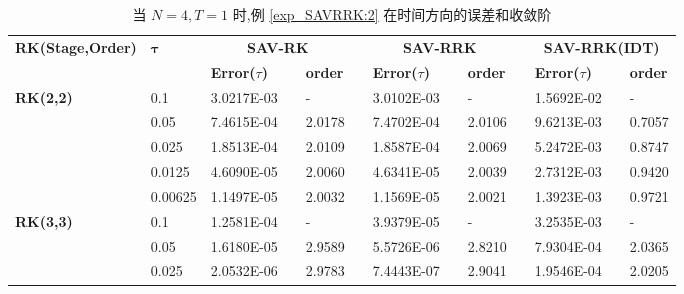 \begin{table}[H]\scriptsize
\centering
\caption{当 $N=4, T = 1$ 时,例 \ref{exp_SAVRRK:2} 在时间方向的误差和收敛阶}
\begin{tabular}{lllllrlrlrlrlrl}
\toprule
\multicolumn{2}{l}{\multirow{2}[3]{*}{\textbf{RK(Stage,Order)}}} & \multicolumn{2}{l}{\multirow{2}[3]{*}{$\bm{\tau}$}} & \multicolumn{3}{c}{\textbf{SAV-RK}} &       & \multicolumn{3}{c}{\textbf{SAV-RRK}} &       & \multicolumn{3}{c}{\textbf{SAV-RRK(IDT)}} \\
\cmidrule{5-7}\cmidrule{9-11}\cmidrule{13-15}    \multicolumn{2}{l}{} & \multicolumn{2}{l}{} & \textbf{Error($\tau$)} &       & \textbf{order} &       & \textbf{Error($\tau$)} &       & \textbf{order} &       & \textbf{Error($\tau$)} &       & \textbf{order} \\
\hline
\multicolumn{2}{l}{\multirow{5}[0]{*}{\textbf{RK(2,2)}}} & \multicolumn{2}{l}{0.1} & 3.0217E-03 &       & -     &       & 3.0102E-03 &       & -     &       & 1.5692E-02 &       & - \\
\multicolumn{2}{l}{} & \multicolumn{2}{l}{0.05} & 7.4615E-04 &       & 2.0178  &       & 7.4702E-04 &       & 2.0106  &       & 9.6213E-03 &       & 0.7057  \\
\multicolumn{2}{l}{} & \multicolumn{2}{l}{0.025} & 1.8513E-04 &       & 2.0109  &       & 1.8587E-04 &       & 2.0069  &       & 5.2472E-03 &       & 0.8747  \\
\multicolumn{2}{l}{} & \multicolumn{2}{l}{0.0125} & 4.6090E-05 &       & 2.0060  &       & 4.6341E-05 &       & 2.0039  &       & 2.7312E-03 &       & 0.9420  \\
\multicolumn{2}{l}{} & \multicolumn{2}{l}{0.00625} & 1.1497E-05 &       & 2.0032  &       & 1.1569E-05 &       & 2.0021  &       & 1.3923E-03 &       & 0.9721  \\
\multicolumn{2}{l}{\multirow{5}[0]{*}{\textbf{RK(3,3)}}} & \multicolumn{2}{l}{0.1} & 1.2581E-04 &       & -     &       & 3.9379E-05 &       & -     &       & 3.2535E-03 &       & - \\
\multicolumn{2}{l}{} & \multicolumn{2}{l}{0.05} & 1.6180E-05 &       & 2.9589  &       & 5.5726E-06 &       & 2.8210  &       & 7.9304E-04 &       & 2.0365  \\
\multicolumn{2}{l}{} & \multicolumn{2}{l}{0.025} & 2.0532E-06 &       & 2.9783  &       & 7.4443E-07 &       & 2.9041  &       & 1.9546E-04 &       & 2.0205  \\

\end{tabular}
\end{table}
